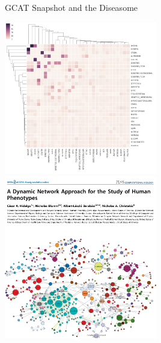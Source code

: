 \documentclass[ignorenonframetext,]{beamer}
\begin{document}
\begin{frame}{GCAT Snapshot and the Diseasome}

\includegraphics[keepaspectratio,width=0.5\textwidth]{images/relative_risk.png}
\includegraphics[keepaspectratio,width=0.5\textwidth]{images/HDN.png}

\end{frame}
\end{document}
